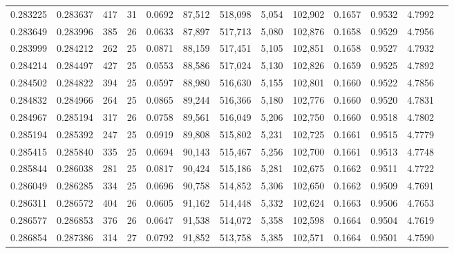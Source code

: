 \begin{tabular}{rrrrrrrrrrrrr}
0.283225 & 0.283637 & 417 &  31 &                                     0.0692 &  87,512 & 518,098 &   5,054 & 102,902 & 0.1657 & 0.9532 & 4.7992 \\
0.283649 & 0.283996 & 385 &  26 &                                     0.0633 &  87,897 & 517,713 &   5,080 & 102,876 & 0.1658 & 0.9529 & 4.7956 \\
0.283999 & 0.284212 & 262 &  25 &                                     0.0871 &  88,159 & 517,451 &   5,105 & 102,851 & 0.1658 & 0.9527 & 4.7932 \\
0.284214 & 0.284497 & 427 &  25 &                                     0.0553 &  88,586 & 517,024 &   5,130 & 102,826 & 0.1659 & 0.9525 & 4.7892 \\
0.284502 & 0.284822 & 394 &  25 &                                     0.0597 &  88,980 & 516,630 &   5,155 & 102,801 & 0.1660 & 0.9522 & 4.7856 \\
0.284832 & 0.284966 & 264 &  25 &                                     0.0865 &  89,244 & 516,366 &   5,180 & 102,776 & 0.1660 & 0.9520 & 4.7831 \\
0.284967 & 0.285194 & 317 &  26 &                                     0.0758 &  89,561 & 516,049 &   5,206 & 102,750 & 0.1660 & 0.9518 & 4.7802 \\
0.285194 & 0.285392 & 247 &  25 &                                     0.0919 &  89,808 & 515,802 &   5,231 & 102,725 & 0.1661 & 0.9515 & 4.7779 \\
0.285415 & 0.285840 & 335 &  25 &                                     0.0694 &  90,143 & 515,467 &   5,256 & 102,700 & 0.1661 & 0.9513 & 4.7748 \\
0.285844 & 0.286038 & 281 &  25 &                                     0.0817 &  90,424 & 515,186 &   5,281 & 102,675 & 0.1662 & 0.9511 & 4.7722 \\
0.286049 & 0.286285 & 334 &  25 &                                     0.0696 &  90,758 & 514,852 &   5,306 & 102,650 & 0.1662 & 0.9509 & 4.7691 \\
0.286311 & 0.286572 & 404 &  26 &                                     0.0605 &  91,162 & 514,448 &   5,332 & 102,624 & 0.1663 & 0.9506 & 4.7653 \\
0.286577 & 0.286853 & 376 &  26 &                                     0.0647 &  91,538 & 514,072 &   5,358 & 102,598 & 0.1664 & 0.9504 & 4.7619 \\
0.286854 & 0.287386 & 314 &  27 &                                     0.0792 &  91,852 & 513,758 &   5,385 & 102,571 & 0.1664 & 0.9501 & 4.7590 \\

\end{tabular}
